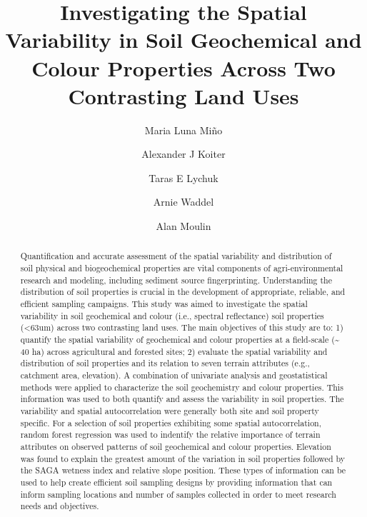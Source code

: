 \documentclass[
  number]{elsarticle}
\begin{document}
\begin{frontmatter}
\title{Investigating the Spatial Variability in Soil Geochemical and
Colour Properties Across Two Contrasting Land Uses}
\author[1]{Maria Luna Miño%
%
}
\author[2]{Alexander J Koiter%
%
}
\author[3]{Taras E Lychuk%
%
}
\author[3]{Arnie Waddel%
%
}
\author[3]{Alan Moulin%
%
}







        
\begin{abstract}
Quantification and accurate assessment of the spatial variability and
distribution of soil physical and biogeochemical properties are vital
components of agri-environmental research and modeling, including
sediment source fingerprinting. Understanding the distribution of soil
properties is crucial in the development of appropriate, reliable, and
efficient sampling campaigns. This study was aimed to investigate the
spatial variability in soil geochemical and colour (i.e., spectral
reflectance) soil properties (\textless63um) across two contrasting land
uses. The main objectives of this study are to: 1) quantify the spatial
variability of geochemical and colour properties at a field-scale
(\textasciitilde{} 40 ha) across agricultural and forested sites; 2)
evaluate the spatial variability and distribution of soil properties and
its relation to seven terrain attributes (e.g., catchment area,
elevation). A combination of univariate analysis and geostatistical
methods were applied to characterize the soil geochemistry and colour
properties. This information was used to both quantify and assess the
variability in soil properties. The variability and spatial
autocorrelation were generally both site and soil property specific. For
a selection of soil properties exhibiting some spatial autocorrelation,
random forest regression was used to indentify the relative importance
of terrain attributes on observed patterns of soil geochemical and
colour properties. Elevation was found to explain the greatest amount of
the variation in soil properties followed by the SAGA wetness index and
relative slope position. These types of information can be used to help
create efficient soil sampling designs by providing information that can
inform sampling locations and number of samples collected in order to
meet research needs and objectives.
\end{abstract}






\end{frontmatter}
\end{document}
